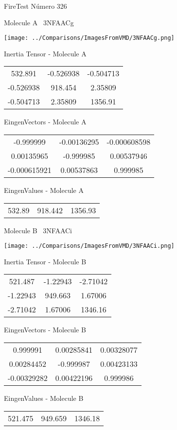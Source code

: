 \vtab[-3cm]
\begin{center}
{\large FireTest \tab Número 326}
\end{center}
\begin{multicols}{2}
\begin{center}

Molecule A \
3NFAACg

\texttt{[image: ../Comparisons/ImagesFromVMD/3NFAACg.png]}

Inertia Tensor - Molecule A \\
\begin{tabular}{|c c c|}
532.891	 & 	-0.526938	 & 	-0.504713	 \\
-0.526938	 & 	918.454	 & 	2.35809	 \\
-0.504713	 & 	2.35809	 & 	1356.91
\end{tabular}

\vtab
 EingenVectors - Molecule A     \\
\begin{tabular}{|c c c|}
-0.999999	 & 	-0.00136295	 & 	-0.000608598	 \\
0.00135965	 & 	-0.999985	 & 	0.00537946	 \\
-0.000615921	 & 	0.00537863	 & 	0.999985
\end{tabular}

\vtab
 EingenValues - Molecule A     \\
\begin{tabular}{|c c c|}
532.89	 & 	918.442	 & 	1356.93	 \\
\end{tabular}
\columnbreak

Molecule B \
3NFAACi

\texttt{[image: ../Comparisons/ImagesFromVMD/3NFAACi.png]}

Inertia Tensor - Molecule B \\
\begin{tabular}{|c c c|}
521.487	 & 	-1.22943	 & 	-2.71042	 \\
-1.22943	 & 	949.663	 & 	1.67006	 \\
-2.71042	 & 	1.67006	 & 	1346.16
\end{tabular}

\vtab
 EingenVectors - Molecule B     \\
\begin{tabular}{|c c c|}
0.999991	 & 	0.00285841	 & 	0.00328077	 \\
0.00284452	 & 	-0.999987	 & 	0.00423133	 \\
-0.00329282	 & 	0.00422196	 & 	0.999986
\end{tabular}

\vtab
 EingenValues - Molecule B     \\
\begin{tabular}{|c c c|}
521.475	 & 	949.659	 & 	1346.18	 \\
\end{tabular}

\end{center}
\end{multicols}

